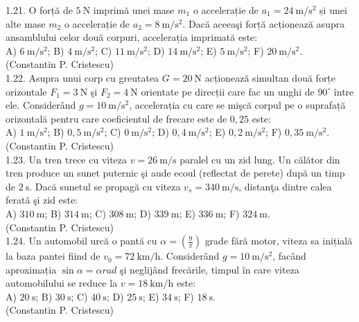 1.21. O forță de $5 \mathrm{~N}$ imprimă unei mase $m_{1}$ o accelerație de $a_{1}=24 \mathrm{~m} / \mathrm{s}^{2}$ și unei alte mase $m_{2}$ o accelerație de $a_{2}=8 \mathrm{~m} / \mathrm{s}^{2}$. Dacă aceeaşi forță acționează asupra ansamblului celor două corpuri, accelerația imprimată este:\\ A) $6 \mathrm{~m} / \mathrm{s}^{2}$; B) $4 \mathrm{~m} / \mathrm{s}^{2}$; C) $11 \mathrm{~m} / \mathrm{s}^{2}$; D) $14 \mathrm{~m} / \mathrm{s}^{2}$; E) $5 \mathrm{~m} / \mathrm{s}^{2}$; F) $20 \mathrm{~m} / \mathrm{s}^{2}$.\\ (Constantin P. Cristescu)\\

1.22. Asupra unui corp cu greutatea $G=20 \mathrm{~N}$ acționează simultan două forțe orizontale $F_{1}=3 \mathrm{~N}$ şi $F_{2}=4 \mathrm{~N}$ orientate pe direcții care fac un unghi de $90^{\circ}$ între ele. Considerând $g=10 \mathrm{~m} / \mathrm{s}^{2}$, accelerația cu care se mişcă corpul pe o suprafață orizontală pentru care coeficientul de frecare este de $0,25$ este:\\ A) $1 \mathrm{~m} / \mathrm{s}^{2}$; B) $0,5 \mathrm{~m} / \mathrm{s}^{2}$; C) $0 \mathrm{~m} / \mathrm{s}^{2}$; D) $0,4 \mathrm{~m} / \mathrm{s}^{2}$; E) $0,2 \mathrm{~m} / \mathrm{s}^{2}$; F) $0,35 \mathrm{~m} / \mathrm{s}^{2}$.\\ (Constantin P. Cristescu)\\

1.23. Un tren trece cu viteza $v=26 \mathrm{~m} / \mathrm{s}$ paralel cu un zid lung. Un călător din tren produce un sunet puternic şi aude ecoul (reflectat de perete) după un timp de $2 \mathrm{~s}$. Dacă sunetul se propagă cu viteza $v_{s}=340 \mathrm{~m} / \mathrm{s}$, distanţa dintre calea ferată şi zid este:\\ A) $310 \mathrm{~m}$; B) $314 \mathrm{~m}$; C) $308 \mathrm{~m}$; D) $339 \mathrm{~m}$; E) $336 \mathrm{~m}$; F) $324 \mathrm{~m}$.\\ (Constantin P. Cristescu)\\

1.24. Un automobil urcă o pantă cu $\alpha=\left(\frac{9}{\pi}\right)$ grade fără motor, viteza sa inițială la baza pantei fiind de $v_{0}=72 \mathrm{~km} / \mathrm{h}$. Considerând $g=10 \mathrm{~m} / \mathrm{s}^{2}$, facând aproximația $\sin \alpha=\alpha rad$ şi neglijând frecările, timpul în care viteza automobilului se reduce la $v=18 \mathrm{~km} / \mathrm{h}$ este:\\ A) $20 \mathrm{~s}$; B) $30 \mathrm{~s}$; C) $40 \mathrm{~s}$; D) $25 \mathrm{~s}$; E) $34 \mathrm{~s}$; F) $18 \mathrm{~s}$.\\ (Constantin P. Cristescu)\\

